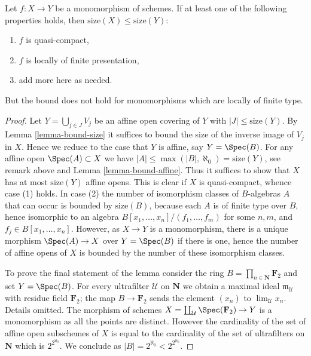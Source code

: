 \begin{lemma}
\label{lemma-bound-monomorphism}
Let $f : X \to Y$ be a monomorphism of schemes.
If at least one of the following properties
holds, then $\text{size}(X) \leq \text{size}(Y)$:
\begin{enumerate}
\item $f$ is quasi-compact,
\item $f$ is locally of finite presentation,
\item add more here as needed.
\end{enumerate}
But the bound does not hold for monomorphisms
which are locally of finite type.
\end{lemma}

\begin{proof}
Let $Y = \bigcup_{j \in J} V_j$ be an affine open covering of $Y$
with $|J| \leq \text{size}(Y)$. By Lemma \ref{lemma-bound-size}
it suffices to bound the size of the inverse image of $V_j$ in $X$.
Hence we reduce to the case that $Y$ is affine, say $Y = \Spec(B)$.
For any affine open $\Spec(A) \subset X$ we have
$|A| \leq \max(|B|, \aleph_0) = \text{size}(Y)$, see remark above
and Lemma \ref{lemma-bound-affine}. Thus it suffices to show
that $X$ has at most $\text{size}(Y)$ affine opens. This is clear
if $X$ is quasi-compact, whence case (1) holds.
In case (2) the number of isomorphism classes of $B$-algebras $A$
that can occur is bounded by $\text{size}(B)$, because each
$A$ is of finite type over $B$, hence isomorphic to an algebra
$B[x_1, \ldots, x_n]/(f_1, \ldots, f_m)$
for some $n, m$, and $f_j \in B[x_1, \ldots, x_n]$. However, as
$X \to Y$ is a monomorphism, there is a unique morphism
$\Spec(A) \to X$ over $Y = \Spec(B)$ if there is one,
hence the number of affine
opens of $X$ is bounded by the number of these isomorphism classes.

\medskip\noindent
To prove the final statement of the lemma consider the ring
$B = \prod_{n \in \mathbf{N}} \mathbf{F}_2$ and set $Y = \Spec(B)$.
For every ultrafilter $\mathcal{U}$ on $\mathbf{N}$ we obtain a maximal
ideal $\mathfrak m_\mathcal{U}$ with residue field $\mathbf{F}_2$;
the map $B \to \mathbf{F}_2$ sends the element $(x_n)$ to
$\lim_\mathcal{U} x_n$. Details omitted.
The morphism of schemes $X = \coprod_\mathcal{U} \Spec(\mathbf{F}_2) \to Y$
is a monomorphism as all the points are distinct. However the cardinality
of the set of affine open subschemes of $X$ is equal to the cardinality
of the set of ultrafilters on $\mathbf{N}$ which is
$2^{2^{\aleph_0}}$. We conclude as $|B| = 2^{\aleph_0} < 2^{2^{\aleph_0}}$.
\end{proof}


